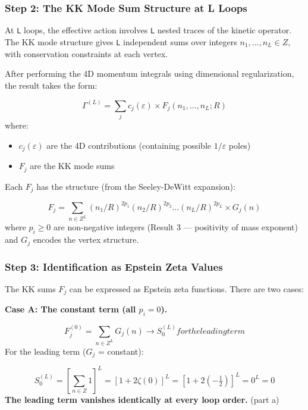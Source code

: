 \documentclass[aps,prd,preprint,superscriptaddress,longbibliography,floatfix]{revtex4-2}
\theoremstyle{remark}
\begin{document}
\subsubsection{Step 2: The KK Mode Sum Structure at L Loops}

At \texttt{L} loops, the effective action involves \texttt{L} nested traces of the kinetic operator. The KK mode structure gives \texttt{L} independent sums over integers $n_{1}, ..., n_L \in Z$, with conservation constraints at each vertex.

After performing the 4D momentum integrals using dimensional regularization, the result takes the form:


\begin{equation}
    \Gamma^{(L)} = \sum_j c_j(\varepsilon) \times F_j(n_{1}, ..., n_L; R)
\end{equation}
where:

\begin{itemize}
  \item $c_j(\varepsilon)$ are the 4D contributions (containing possible $1/\varepsilon$ poles)
  \item $F_j$ are the KK mode sums
\end{itemize}

Each $F_j$ has the structure (from the Seeley-DeWitt expansion):


\begin{equation}
    F_j = \sum_{n \in Z^L} (n_{1}/R)^{2p_{1}} (n_{2}/R)^{2p_{2}} ... (n_L/R)^{2p_L} \times G_j(n)
\end{equation}
where $p_i \geq 0$ are non-negative integers (Result 3 --- positivity of mass exponent) and $G_j$ encodes the vertex structure.


\subsubsection{Step 3: Identification as Epstein Zeta Values}

The KK sums $F_j$ can be expressed as Epstein zeta functions. There are two cases:

\textbf{Case A: The constant term (all $p_i = 0$).}


\begin{equation}
    F_j^{(0)} = \sum_{n \in Z^L} G_j(n) \to S_{0}^{(L)} for the leading term
\end{equation}
For the leading term ($G_j$ = constant):


\begin{equation}
    S_{0}^{(L)} = [\sum_{n \in Z} 1]^L = [1 + 2\zeta(0)]^L = [1 + 2(-\tfrac{1}{2})]^L = 0^L = 0
\end{equation}
\textbf{The leading term vanishes identically at every loop order.} (part a)
\end{document}

